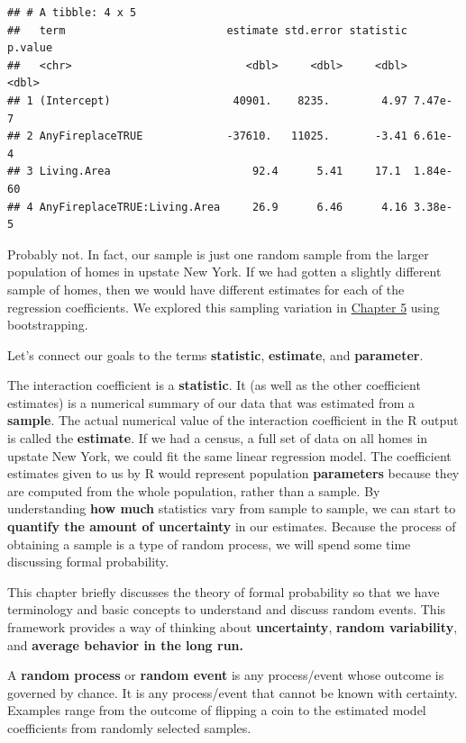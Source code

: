\documentclass[
]{book}
\begin{document}
\begin{verbatim}
## # A tibble: 4 x 5
##   term                         estimate std.error statistic  p.value
##   <chr>                           <dbl>     <dbl>     <dbl>    <dbl>
## 1 (Intercept)                   40901.    8235.        4.97 7.47e- 7
## 2 AnyFireplaceTRUE             -37610.   11025.       -3.41 6.61e- 4
## 3 Living.Area                      92.4      5.41     17.1  1.84e-60
## 4 AnyFireplaceTRUE:Living.Area     26.9      6.46      4.16 3.38e- 5
\end{verbatim}

Probably not. In fact, our sample is just one random sample from the larger population of homes in upstate New York. If we had gotten a slightly different sample of homes, then we would have different estimates for each of the regression coefficients. We explored this sampling variation in \hyperref[randvariability]{Chapter 5} using bootstrapping.

Let's connect our goals to the terms \textbf{statistic}, \textbf{estimate}, and \textbf{parameter}.

The interaction coefficient is a \textbf{statistic}. It (as well as the other coefficient estimates) is a numerical summary of our data that was estimated from a \textbf{sample}. The actual numerical value of the interaction coefficient in the R output is called the \textbf{estimate}. If we had a census, a full set of data on all homes in upstate New York, we could fit the same linear regression model. The coefficient estimates given to us by R would represent population \textbf{parameters} because they are computed from the whole population, rather than a sample. By understanding \textbf{how much} statistics vary from sample to sample, we can start to \textbf{quantify the amount of uncertainty} in our estimates. Because the process of obtaining a sample is a type of random process, we will spend some time discussing formal probability.

This chapter briefly discusses the theory of formal probability so that we have terminology and basic concepts to understand and discuss random events. This framework provides a way of thinking about \textbf{uncertainty}, \textbf{random variability}, and \textbf{average behavior in the long run.}

A \textbf{random process} or \textbf{random event} is any process/event whose outcome is governed by chance. It is any process/event that cannot be known with certainty. Examples range from the outcome of flipping a coin to the estimated model coefficients from randomly selected samples.
\end{document}
